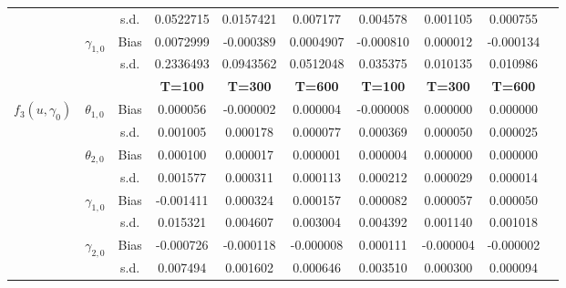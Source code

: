 \documentclass[12pt,a4paper]{article}
\begin{document}
\begin{table}[htbp]
\begin{adjustbox}{max width=0.95\textwidth}
\begin{tabular}{clcccccccc}
				&   & s.d. & 0.0522715 & 0.0157421 & 0.007177 & 0.004578 & 0.001105 & 0.000755 \\
				& \multirow{2}[0]{*}{$\gamma_{1,0}$} & Bias & 0.0072999 & -0.000389 & 0.0004907 & -0.000810 & 0.000012 & -0.000134 \\
				&   & s.d. & 0.2336493 & 0.0943562 & 0.0512048 & 0.035375 & 0.010135 & 0.010986 \\
				\hline
				&   &   & \textbf{T=100} & \textbf{T=300} & \textbf{T=600} & \textbf{T=100} & \textbf{T=300} & \textbf{T=600} \\
				\hline
				\multirow{8}[0]{*}{$f_3(u,\gamma_{0})$} & \multirow{2}[0]{*}{$\theta_{1,0}$} & Bias & 0.000056 & -0.000002 & 0.000004 & -0.000008 & 0.000000 & 0.000000 \\
				&   & s.d. & 0.001005 & 0.000178 & 0.000077 & 0.000369 & 0.000050 & 0.000025 \\
				& \multirow{2}[0]{*}{$\theta_{2,0}$} & Bias & 0.000100 & 0.000017 & 0.000001 & 0.000004 & 0.000000 & 0.000000 \\
				&   & s.d. & 0.001577 & 0.000311 & 0.000113 & 0.000212 & 0.000029 & 0.000014 \\
				& \multirow{2}[0]{*}{$\gamma_{1,0}$} & Bias & -0.001411 & 0.000324 & 0.000157 & 0.000082 & 0.000057 & 0.000050 \\
				&   & s.d. & 0.015321 & 0.004607 & 0.003004 & 0.004392 & 0.001140 & 0.001018 \\
				& \multirow{2}[0]{*}{$\gamma_{2,0}$} & Bias & -0.000726 & -0.000118 & -0.000008 & 0.000111 & -0.000004 & -0.000002 \\
				&   & s.d. & 0.007494 & 0.001602 & 0.000646 & 0.003510 & 0.000300 & 0.000094 \\
				\hline \hline
			\end{tabular}%
		\end{adjustbox}
	\end{table}%
	
\end{document}
